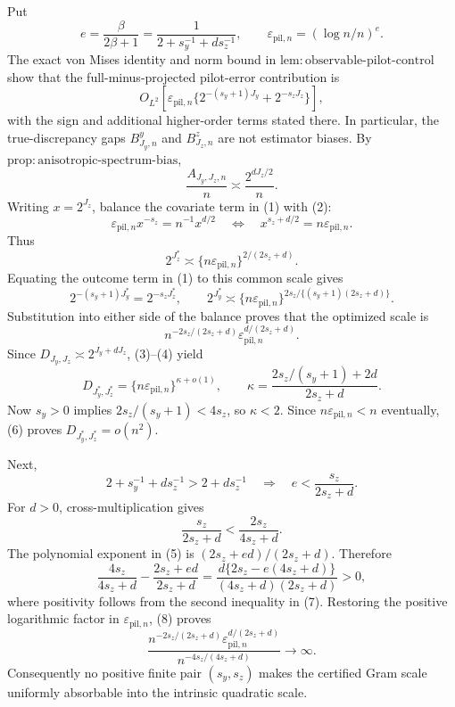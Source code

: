 Put
\[
e=\frac{\beta}{2\beta+1}
=\frac{1}{2+s_y^{-1}+ds_z^{-1}},
\qquad
\varepsilon_{\mathrm{pil},n}=(\log n/n)^e.
\]
The exact von Mises identity and norm bound in
\(\mathrm{lem{:}observable\text{-}pilot\text{-}control}\) show that the full-minus-projected pilot-error contribution is
\[
O_{L^2}\!\left[
\varepsilon_{\mathrm{pil},n}
\{2^{-(s_y+1)J_y}+2^{-s_zJ_z}\}
\right],                                                    \tag{1}
\]
with the sign and additional higher-order terms stated there.  In particular, the true-discrepancy gaps \(B^y_{J_y,n}\) and \(B^z_{J_z,n}\) are not estimator biases.  By
\(\mathrm{prop{:}anisotropic\text{-}spectrum\text{-}bias}\),
\[
\frac{A_{J_y,J_z,n}}n\asymp\frac{2^{dJ_z/2}}n.             \tag{2}
\]
Writing \(x=2^{J_z}\), balance the covariate term in (1) with (2):
\[
\varepsilon_{\mathrm{pil},n}x^{-s_z}
=n^{-1}x^{d/2}
\quad\Longleftrightarrow\quad
x^{s_z+d/2}=n\varepsilon_{\mathrm{pil},n}.
\]
Thus
\[
2^{J_z^*}\asymp
\{n\varepsilon_{\mathrm{pil},n}\}^{2/(2s_z+d)}.           \tag{3}
\]
Equating the outcome term in (1) to this common scale gives
\[
2^{-(s_y+1)J_y^*}=2^{-s_zJ_z^*},
\qquad
2^{J_y^*}\asymp
\{n\varepsilon_{\mathrm{pil},n}\}^{2s_z/\{(s_y+1)(2s_z+d)\}}. \tag{4}
\]
Substitution into either side of the balance proves that the optimized scale is
\[
n^{-2s_z/(2s_z+d)}
\varepsilon_{\mathrm{pil},n}^{d/(2s_z+d)}.                 \tag{5}
\]
Since \(D_{J_y,J_z}\asymp2^{J_y+dJ_z}\), (3)--(4) yield
\[
D_{J_y^*,J_z^*}
=\{n\varepsilon_{\mathrm{pil},n}\}^{\kappa+o(1)},
\qquad
\kappa=\frac{2s_z/(s_y+1)+2d}{2s_z+d}.                     \tag{6}
\]
Now \(s_y>0\) implies
\(2s_z/(s_y+1)<4s_z\), so \(\kappa<2\).  Since
\(n\varepsilon_{\mathrm{pil},n}<n\) eventually, (6) proves
\(D_{J_y^*,J_z^*}=o(n^2)\).

Next,
\[
2+s_y^{-1}+ds_z^{-1}>2+ds_z^{-1}
\quad\Longrightarrow\quad
e<\frac{s_z}{2s_z+d}.
\]
For \(d>0\), cross-multiplication gives
\[
\frac{s_z}{2s_z+d}<\frac{2s_z}{4s_z+d}.                    \tag{7}
\]
The polynomial exponent in (5) is
\((2s_z+ed)/(2s_z+d)\).  Therefore
\[
\frac{4s_z}{4s_z+d}-\frac{2s_z+ed}{2s_z+d}
=\frac{d\{2s_z-e(4s_z+d)\}}
{(4s_z+d)(2s_z+d)}>0,                                       \tag{8}
\]
where positivity follows from the second inequality in (7).  Restoring the positive logarithmic factor in \(\varepsilon_{\mathrm{pil},n}\), (8) proves
\[
\frac{n^{-2s_z/(2s_z+d)}
\varepsilon_{\mathrm{pil},n}^{d/(2s_z+d)}}
{n^{-4s_z/(4s_z+d)}}\longrightarrow\infty.                 \tag{9}
\]
Consequently no positive finite pair \((s_y,s_z)\) makes the certified Gram scale uniformly absorbable into the intrinsic quadratic scale.

